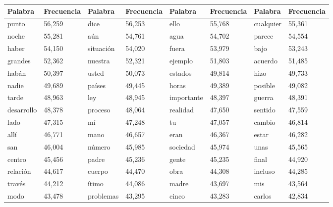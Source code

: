 \begin{table}

\begin{tabular}{|l|l|l|l|l|l|l|l|}


\hline

Palabra & Frecuencia & Palabra & Frecuencia & Palabra & Frecuencia & Palabra & Frecuencia  \\

	\hline
	
	  punto	&   56,259	  &
   dice	&   56,253	   &
   ello	&   55,768	  &
   cualquier	&   55,361	\\ 
   	noche 	&   55,281	  &
   	a\'un 	&   54,761	   &
   	agua 	&   54,702 &
   	parece 	&   54,554	 \\
   	haber	&   54,150	  &
   	situaci\'on	&   54,020	   &
   	fuera &	   53,979	   &
   	bajo	&   53,243	   \\
   	grandes &	   52,362	   &
   	nuestra	&   52,321	&
   	ejemplo &	   51,803	&
   	acuerdo &	   51,485	  \\
   	hab\'an	 &  50,397	 &
   	usted	 &  50,073	   &
   	estados  &	   49,814	  &
   	hizo	 &  49,733	   \\
   	nadie	 &  49,689	  &
   	pa\'ises	&   49,445	   &
   	horas	 &  49,389	  &
   	posible	&   49,082	   \\
   	tarde	&   48,963	   &
   	ley	  &  48,945	   &
    importante	 &  48,397	   &
   	guerra	 &  48,391	   \\
   	desarrollo	&   48,378	 &
   	proceso &	   48,064	   &
   	realidad	&   47,650	&
   	sentido	 &  47,559	   \\
   	lado	&   47,315	&
   	m\'i	&   47,248	&
   	tu	  & 47,057	  &
   	cambio &	   46,814	   \\
   	all\'i	&   46,771	 &
   	mano 	 &  46,657	   &
   	eran	 &  46,367	  &
   	estar	 &  46,282	   \\
   	san 	 &  46,004	  &
   	n\'umero &	   45,985	  &
   	sociedad  &	   45,974	   &
    unas 	  & 45,565	  \\
   	centro	&   45,456	&
   	padre	 &  45,236	   &
   	gente	 &  45,235	  &
   	final	 &  44,920	   \\
   	relaci\'on	&   44,617	  &
   	cuerpo 	 &  44,470	   &
   	obra	&   44,308	 &
   	incluso	 &  44,285	 \\
   	trav\'es	&   44,212	 &
   	\'itimo	 &  44,086	  &
   	madre 	 &  43,697	  &
   	mis 	&   43,564	   \\
   	modo 	&   43,478	 &
   	problemas &	   43,295	   &
   	cinco	 &  43,283	  &
   	carlos	 &  42,834	   \\
    	    

\end{tabular}
\end{table}
